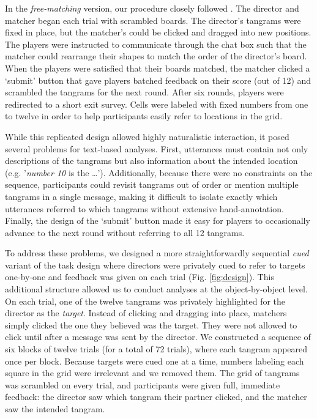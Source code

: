 \documentclass[alpha-refs]{wiley-article}
\begin{document}
In the \emph{free-matching} version, our procedure closely followed \cite{ClarkWilkesGibbs86_ReferringCollaborative}.
The director and matcher began each trial with scrambled boards.
The director's tangrams were fixed in place, but the matcher's could be clicked and dragged into new positions.
The players were instructed to communicate through the chat box such that the matcher could rearrange their shapes to match the order of the director's board.
When the players were satisfied that their boards matched, the matcher clicked a `submit' button that gave players batched feedback on their score (out of 12) and scrambled the tangrams for the next round.
After six rounds, players were redirected to a short exit survey.
Cells were labeled with fixed numbers from one to twelve in order to help participants easily refer to locations in the grid.

While this replicated design allowed highly naturalistic interaction, it posed several problems for text-based analyses.
First, utterances must contain not only descriptions of the tangrams but also information about the intended location (e.g. '\emph{number 10} is the \dots').
Additionally, because there were no constraints on the sequence, participants could revisit tangrams out of order or mention multiple tangrams in a single message, making it difficult to isolate exactly which utterances referred to which tangrams without extensive hand-annotation.
Finally, the design of the `submit' button made it easy for players to occasionally advance to the next round without referring to all 12 tangrams.

To address these problems, we designed a more straightforwardly sequential \emph{cued} variant of the task design where directors were privately cued to refer to targets one-by-one and feedback was given on each trial (Fig. \ref{fig:design}).
This additional structure allowed us to conduct analyses at the object-by-object level.
On each trial, one of the twelve tangrams was privately highlighted for the director as the \emph{target}.
Instead of clicking and dragging into place, matchers simply clicked the one they believed was the target.
They were not allowed to click until after a message was sent by the director.
We constructed a sequence of six blocks of twelve trials (for a total of 72 trials), where each tangram appeared once per block.
Because targets were cued one at a time, numbers labeling each square in the grid were irrelevant and we removed them.
The grid of tangrams was scrambled on every trial, and participants were given full, immediate feedback: the director saw which tangram their partner clicked, and the matcher saw the intended tangram.
\end{document}
